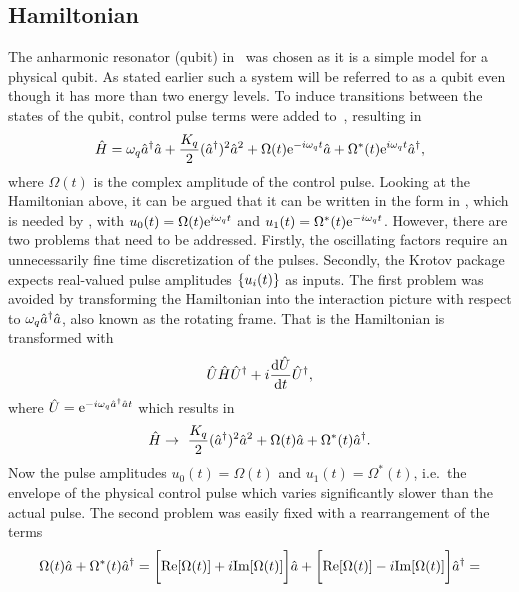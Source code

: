 \documentclass[main.tex]{subfiles}
\begin{document}
\subsection{Hamiltonian}
The anharmonic resonator (qubit) in~ was chosen as it is a simple model for a physical qubit.
As stated earlier such a system will be referred to as a qubit even though it has more than two energy levels.
To induce transitions between the states of the qubit, control pulse terms were added to~, resulting in
\begin{equation}
    \hat{H} = \omega_{q} \hat{a}^\dagger\hat{a} + \frac{K_q}{2} (\hat{a}^\dagger)^2\hat{a}^2 + \Omega(t)\mathrm{e}^{-i\omega_{q}t}\hat{a} + \Omega^*(t)\mathrm{e}^{i\omega_{q}t}\hat{a}^\dagger,
    \label{eq:system-hamiltonian}
\end{equation}
where \( \Omega(t) \) is the complex amplitude of the control pulse.
Looking at the Hamiltonian above, it can be argued that it can be written in the form in , which is needed by \krotov{}, with \( u_0(t) = \Omega(t)\mathrm{e}^{i\omega_{q}t} \) and \( u_1(t) = \Omega^*(t)\mathrm{e}^{-i\omega_{q}t} \).
However, there are two problems that need to be addressed.
Firstly, the oscillating factors require an unnecessarily fine time discretization of the pulses.
Secondly, the Krotov package expects real-valued pulse amplitudes \( \qty{u_i(t)} \) as inputs.
The first problem was avoided by transforming the Hamiltonian into the interaction picture with respect to \(\omega_{q} \hat{a}^\dagger\hat{a} \), also known as the rotating frame.
That is the Hamiltonian is transformed with
\begin{equation}
    \hat{U}\hat{H}\hat{U}^\dagger + i\dv{\hat{U}}{t}\hat{U}^\dagger,
\end{equation}
where \( \hat{U} = \mathrm{e}^{-i\omega_{q} \hat{a}^\dagger\hat{a} t} \) which results in
\begin{equation}
    \hat{H} \rightarrow~ \frac{K_q}{2}(\hat{a}^\dagger)^2\hat{a}^2 + \Omega(t)\hat{a} + \Omega^*(t)\hat{a}^\dagger.
    \label{eq:krotov-hamiltonian-rotating}
\end{equation}
Now the pulse amplitudes \( u_0(t) = \Omega(t) \) and \( u_1(t) = \Omega^*(t) \), i.e.\ the envelope of the physical control pulse which varies significantly slower than the actual pulse.
The second problem was easily fixed with a rearrangement of the terms
\[ \Omega(t)\hat{a} + \Omega^*(t)\hat{a}^\dagger = \bigg[\text{Re}\qty[\Omega(t)]+i\text{Im}\qty[\Omega(t)]\bigg]\hat{a} + \bigg[\text{Re}\qty[\Omega(t)]-i\text{Im}\qty[\Omega(t)]\bigg]\hat{a}^\dagger = \]
\end{document}
